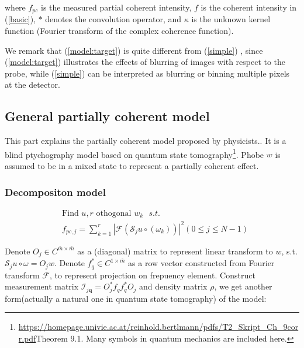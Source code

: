 \documentclass{article}
\numberwithin{equation}{section}
\begin{document}
where $f_{p c}$ is the measured partial coherent intensity, $f$ is the coherent intensity in (\ref{basic}), $*$ denotes the convolution operator, and $\kappa$ is the unknown kernel function (Fourier transform of the complex coherence function). 



We remark that (\ref{model:target}) is quite different from
 (\ref{simple}) , since (\ref{model:target}) illustrates the effects of blurring of images with respect to the probe, while (\ref{simple}) can be interpreted as blurring or binning multiple pixels at the detector.

\subsection{General partially coherent model}
This part explains the partially coherent model proposed by physicists.\cite{mix}.   It is a blind ptychography model based on quantum state tomography\footnote{\url{https://homepage.univie.ac.at/reinhold.bertlmann/pdfs/T2_Skript_Ch_9corr.pdf}Theorem 9.1. Many symbols in quantum mechanics are included here.}.  Phobe $w$ is assumed to be in a mixed state to represent a partially coherent effect.


\subsubsection{Decompositon model}

 
\begin{equation}
\label{sep} 
\begin{aligned}
&\mbox{Find } u, r \mbox{ othogonal $w_k$   }s.t. \\
&f_{p c, j}=\sum_{k=1}^r \left|\mathcal{F}\left( \mathcal{S}_{j} u \circ \left(\omega_k\right) \right)\right|^{2} (0\leq j \leq N-1)
\end{aligned}
\end{equation}

 


Denote $O_j \in C^{\bar{m} \times \bar{m}}$ as a (diagonal) matrix to represent linear transform to $w$, s.t. $\mathcal{S}_{j} u \circ \omega = O_j w$. Denote $f_q^* \in C^{1 \times \bar{m}}$ as a row vector  constructed from Fourier transform $\mathcal{F}$, to represent projection on frepuency element. Construct measurement matrix $ \mathcal{I}_{j \mathbf{q}} = O_j^*f_qf_q^*O_j$ and density matrix $\rho$, we get another form(actually a natural one in quantum state tomography) of the model:
\end{document}
